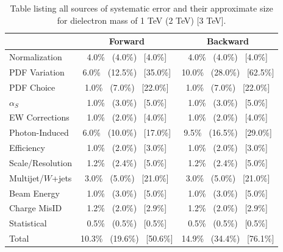 \begin {table}[h]
\begin{center}
\begin{tabular}{ | l | c c | }
                                & Forward                           & Backward                      \\
            \hline
            Normalization       & 4.0\% ~(4.0\%) ~[4.0\%]           & 4.0\% ~(4.0\%) ~[4.0\%] \\
            PDF Variation       & 6.0\% ~(12.5\%) ~[35.0\%]         & 10.0\% ~(28.0\%) ~[62.5\%] \\
            PDF Choice          & 1.0\% ~(7.0\%) ~[22.0\%]          & 1.0\% ~(7.0\%) ~[22.0\%] \\
            $\alpha_S$          & 1.0\% ~(3.0\%) ~[5.0\%]           & 1.0\% ~(3.0\%) ~[5.0\%] \\
            EW Corrections      & 1.0\% ~(2.0\%) ~[4.0\%]           & 1.0\% ~(2.0\%) ~[4.0\%] \\
            Photon-Induced      & 6.0\% ~(10.0\%) ~[17.0\%]         & 9.5\% ~(16.5\%) ~[29.0\%]    \\
            Efficiency          & 1.0\% ~(2.0\%) ~[3.0\%]           & 1.0\% ~(2.0\%) ~[3.0\%] \\
            Scale/Resolution    & 1.2\% ~(2.4\%) ~[5.0\%]           & 1.2\% ~(2.4\%) ~[5.0\%] \\
            Multijet/$W$+jets  & 3.0\% ~(5.0\%) ~[21.0\%]          & 3.0\% ~(5.0\%) ~[21.0\%] \\
            Beam Energy         & 1.0\% ~(3.0\%) ~[5.0\%]           & 1.0\% ~(3.0\%) ~[5.0\%] \\
            Charge MisID        & 1.2\% ~(2.0\%) ~[2.9\%]           & 1.2\% ~(2.0\%) ~[2.9\%] \\
            Statistical         & 0.5\% ~(0.5\%) ~[0.5\%]           & 0.5\% ~(0.5\%) ~[0.5\%] \\
            \hline   
            Total               & 10.3\% ~(19.6\%) ~[50.6\%]        & 14.9\% ~(34.4\%) ~[76.1\%] \\ 
            \hline
        \end{tabular}
        \caption{Table listing all sources of systematic error and their approximate size for dielectron mass of 1 TeV (2 TeV) [3 TeV].}
        \label{tab:sys}
        \end{center}
    \end {table}


